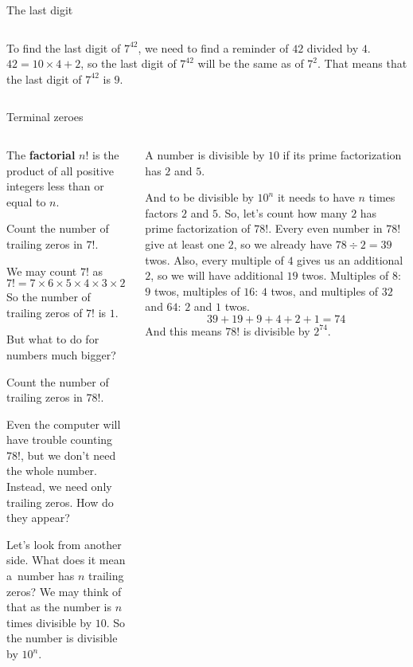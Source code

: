 \documentclass[9pt,aspectratio=169]{beamer}
\begin{document}
\begin{frame}{The last digit}
\begin{columns}[T]
\begin{column}{0.5\textwidth}
      To find the last digit of $7^{42}$, we need to find a reminder of $42$ divided by $4$. $42 = 10 \times 4 + 2$, so the last digit of $7^{42}$ will be the same as of $7^2$. That means that the last digit of $7^{42}$ is $9$.
    \end{column}
  \end{columns}
\end{frame}

\begin{frame}{Terminal zeroes}
  \begin{columns}[T]
    \begin{column}{0.5\textwidth}
      \begin{example}
        The \textbf{factorial} $n!$ is the product of all positive integers less than or equal to $n$.
      \end{example}
      \begin{problem}
        Count the number of trailing zeros in $7!$.
      \end{problem}
      We may count $7!$ as 
      \[ 7! = 7 \times 6 \times 5 \times 4 \times 3 \times 2 \times 1 = 5{,}040. \]
      So the number of trailing zeros of $7!$ is $1$.\smallskip

      But what to do for numbers much bigger?
      \begin{problem}
        Count the number of trailing zeros in $78!$.
      \end{problem}
      Even the computer will have trouble counting $78!$, but we don't need the whole number. Instead, we need only trailing zeros. How do they appear? 

      Let's look from another side. What does it mean a~number has $n$ trailing zeros? We may think of that as the number is $n$ times divisible by $10$. So the number is divisible by $10^n$.
    \end{column}
    \begin{column}{0.5\textwidth}
      \begin{definition}
        A number is divisible by $10$ if its prime factorization has $2$ and $5$.
      \end{definition}
      And to be divisible by $10^n$ it needs to have $n$ times factors $2$ and $5$. So, let's count how many $2$ has prime factorization of $78!$. Every even number in $78!$ give at least one $2$, so we already have $78 \div 2 = 39$ twos. Also, every multiple of $4$ gives us an additional $2$, so we will have additional $19$ twos. Multiples of $8$: $9$ twos, multiples of $16$: $4$ twos, and multiples of $32$ and $64$: $2$ and $1$ twos.
      \[ 39 + 19 + 9 + 4 + 2 + 1 = 74 \]
      And this means $78!$ is divisible by $2^{74}$.
      

\end{column}
\end{columns}
\end{frame}
\end{document}
